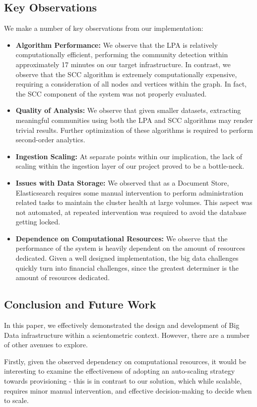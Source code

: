 \documentclass[10pt,journal,final,a4paper]{IEEEtran}
\begin{document}
\subsection{Key Observations}
We make a number of key observations from our implementation:
\begin{itemize}
\item \textbf{Algorithm Performance:} We observe that the LPA is relatively computationally efficient, performing the community detection within approximately 17 minutes on our target infrastructure. In contrast, we observe that the SCC algorithm is extremely computationally expensive, requiring a consideration of all nodes and vertices within the graph. In fact, the SCC component of the system was not properly evaluated.
\item \textbf{Quality of Analysis:} We observe that given smaller datasets, extracting meaningful communities using both the LPA and SCC algorithms may render trivial results. Further optimization of these algorithms is required to perform second-order analytics.
\item \textbf{Ingestion Scaling:} At separate points within our implication, the lack of scaling within the ingestion layer of our project proved to be a bottle-neck.
\item \textbf{Issues with Data Storage:} We observed that as a Document Store, Elasticsearch requires some manual intervention to perform administration related tasks to maintain the cluster health at large volumes. This aspect was not automated, at repeated intervention was required to avoid the database getting locked.
\item \textbf{Dependence on Computational Resources:} We observe that the performance of the system is heavily dependent on the amount of resources dedicated. Given a well designed implementation, the big data challenges quickly turn into financial challenges, since the greatest determiner is the amount of resources dedicated.
\end{itemize}

\subsection{Conclusion and Future Work}
In this paper, we effectively demonstrated the design and development of Big Data infrastructure within a scientometric context. However, there are a number of other avenues to explore. 

Firstly, given the observed dependency on computational resources, it would be interesting to examine the effectiveness of adopting an auto-scaling strategy towards provisioning - this is in contrast to our solution, which while scalable, requires minor manual intervention, and effective decision-making to decide when to scale. 
\end{document}
